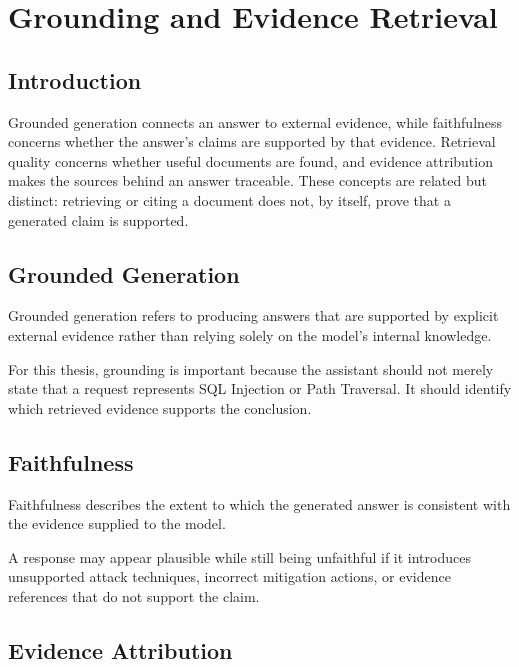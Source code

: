 \section{Grounding and Evidence
Retrieval}\label{grounding-and-evidence-retrieval}

\subsection{Introduction}\label{grounding-introduction}

Grounded generation connects an answer to external evidence, while
faithfulness concerns whether the answer's claims are supported by that
evidence. Retrieval quality concerns whether useful documents are found,
and evidence attribution makes the sources behind an answer traceable.
These concepts are related but distinct: retrieving or citing a document
does not, by itself, prove that a generated claim is supported.

\subsection{Grounded Generation}\label{grounded-generation}

Grounded generation refers to producing answers that are supported by
explicit external evidence rather than relying solely on the model's
internal knowledge.

For this thesis, grounding is important because the assistant should not
merely state that a request represents SQL Injection or Path Traversal.
It should identify which retrieved evidence supports the conclusion.

\subsection{Faithfulness}\label{faithfulness}

Faithfulness describes the extent to which the generated answer is
consistent with the evidence supplied to the model.

A response may appear plausible while still being unfaithful if it
introduces unsupported attack techniques, incorrect mitigation actions,
or evidence references that do not support the claim.

\subsection{Evidence Attribution}\label{evidence-attribution}

